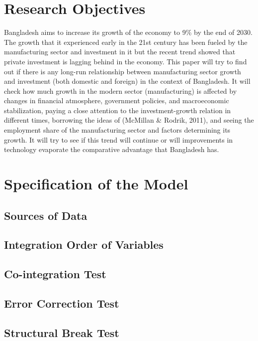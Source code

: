 \documentclass[11pt,a4paper]{article}
\begin{document}
\section{Research Objectives}

\normalsize Bangladesh aims to increase its growth of the economy to 9\% by the end of 2030. The growth that it experienced early in the 21st century has been fueled by the manufacturing sector and investment in it but the recent trend showed that private investment is lagging behind in the economy. This paper will try to find out if there is any long-run relationship between manufacturing sector growth and investment (both domestic and foreign) in the context of Bangladesh. It will check how much growth in the modern sector (manufacturing) is affected by changes in financial atmosphere, government policies, and macroeconomic stabilization, paying a close attention to the investment-growth relation in different times, borrowing the ideas of (McMillan \& Rodrik, 2011), and seeing the employment share of the manufacturing sector and factors determining its growth. It will try to see if this trend will continue or will improvements in technology evaporate the comparative advantage that Bangladesh has.

\section{Specification of the Model}

\subsection{Sources of Data}

\subsection{Integration Order of Variables}

\subsection{Co-integration Test}

\subsection{Error Correction Test}

\subsection{Structural Break Test }
\end{document}
